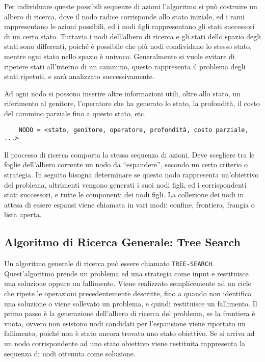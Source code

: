 \documentclass{article}
\numberwithin{equation}{subsection}
\begin{document}
Per individuare queste possibili sequenze di azioni l'algoritmo si può costruire un albero di 
ricerca, dove il nodo radice corrisponde allo stato iniziale, ed i rami rappresentano 
le azioni possibili, ed i nodi figli rappresentano gli stati successori di un certo stato. 
Tuttavia i nodi dell'albero di ricerca e gli stati dello spazio degli stati sono differenti, poiché 
è possibile che più nodi condividano lo stesso stato, mentre ogni stato nello spazio è univoco. 
Generalmente si vuole evitare di ripetere stati all'interno di un cammino, questo rappresenta il 
problema degli stati ripetuti, e sarà analizzato successivamente. 

Ad ogni nodo si possono inserire altre informazioni utili, oltre allo stato, un riferimento al 
genitore, l'operatore che ha generato lo stato, la profondità, il costo del cammino parziale 
fino a questo stato, etc. 
\begin{verbatim}
    NODO = <stato, genitore, operatore, profondità, costo parziale, ...>
\end{verbatim}

Il processo di ricerca comporta la stessa sequenza di azioni. Deve scegliere tra le foglie 
dell'albero corrente un nodo da ``espandere'', secondo un certo criterio o strategia. 
In seguito bisogna determinare se questo nodo rappresenta un'obiettivo del problema, 
altrimenti vengono generati i suoi nodi figli, ed i corrispondenti stati successori, e tutte 
le componenti dei nodi figli. 
La collezione dei nodi in attesa di essere espansi viene chiamata in vari modi: confine, 
frontiera, frangia o lista aperta. 

\subsection{Algoritmo di Ricerca Generale: Tree Search}

Un algoritmo generale di ricerca può essere chiamato \color{red}\verb|TREE-SEARCH|\color{black}. Quest'algoritmo 
prende un problema ed una strategia come input e restituisce una soluzione oppure un fallimento. 
Viene realizzato semplicemente ad un ciclo che ripete le operazioni precedentemente descritte, 
fino a quando non identifica una soluzione o viene sollevato un problema, e quindi restituisce 
un fallimento. Il primo passo è la generazione dell'albero di ricerca del problema, se la frontiera è 
vuota, ovvero non esistono nodi candidati per l'espansione viene riportato un fallimento, poiché 
non è stato ancora trovato uno stato obiettivo. Se si arriva ad un nodo corrispondente ad uno 
stato obiettivo viene restituita rappresenta la sequenza di nodi ottenuta come soluzione. 
\end{document}
